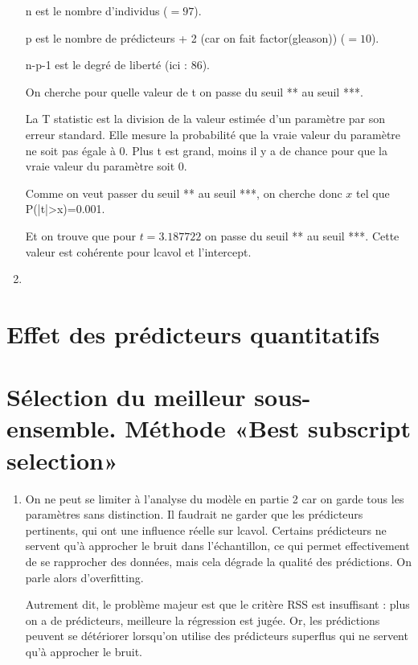 \documentclass[a4paper, 12pt]{article}
\begin{document}
\begin{enumerate}
n est le nombre d'individus ($=97$).

p est le nombre de prédicteurs + 2 (car on fait factor(gleason)) ($=10$).

n-p-1 est le degré de liberté (ici : $86$).

On cherche pour quelle valeur de t on passe du seuil ** au seuil ***.

La T statistic est la division de la valeur estimée d'un paramètre par son erreur standard. Elle mesure la probabilité que la vraie valeur du paramètre ne soit pas égale à $0$. Plus t est grand, moins il y a de chance pour que la vraie valeur du paramètre soit $0$.

Comme on veut passer du seuil ** au seuil ***, on cherche donc $x$ tel que P(|t|>x)=0.001.

Et on trouve que pour $t=3.187722$ on passe du seuil ** au seuil ***. Cette valeur est cohérente pour lcavol et l'intercept.

\item


\end{enumerate}

\section{Effet des prédicteurs quantitatifs}

\section{Sélection du meilleur sous-ensemble. Méthode «Best subscript selection»}

\begin{enumerate}

\item On ne peut se limiter à l'analyse du modèle en partie 2 car on garde tous les paramètres sans distinction. Il faudrait ne garder que les prédicteurs pertinents, qui ont une influence réelle sur lcavol. Certains prédicteurs ne servent qu'à approcher le bruit dans l'échantillon, ce qui permet effectivement de se rapprocher des données, mais cela dégrade la qualité des prédictions. On parle alors d'overfitting.

Autrement dit, le problème majeur est que le critère RSS est insuffisant : plus on a de prédicteurs, meilleure la régression est jugée. Or, les prédictions peuvent se détériorer lorsqu'on utilise des prédicteurs superflus qui ne servent qu'à approcher le bruit.



\end{enumerate}
\end{document}
